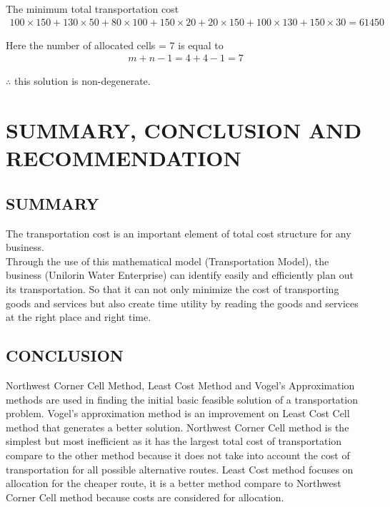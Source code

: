 \documentclass[12pt]{report}
\newcommand{\sps}{\\[0.2cm]}
\newcommand{\NI}{\noindent}
\begin{document}
	\NI The minimum total transportation cost
	\begin{gather*}
		100\times 150 + 130\times 50 + 80\times 100+150\times 20 +20\times 150 + 100\times 130 + 150\times 30 = 61450
	\end{gather*}
	
	\NI Here the number of allocated cells = 7 is equal to
	\begin{gather*}
		m+n-1 = 4+4-1=7
	\end{gather*}
	
	\NI$\therefore$ this solution is non-degenerate.
	
	
	
	
	
	
	
	
	
	
	
	
	
	\chapter{SUMMARY, CONCLUSION AND RECOMMENDATION}
	\section{SUMMARY}
	The transportation cost is an important element of total cost structure for any business.\sps
	Through the use of this mathematical model (Transportation Model), the business (Unilorin Water Enterprise) can identify easily and efficiently plan out its transportation. So that it can not only minimize the cost of transporting goods and services but also create time utility by reading the goods and services at the right place and right time.
	
	\section{CONCLUSION}
	Northwest Corner Cell Method, Least Cost Method and Vogel's Approximation methods are used in finding the initial basic feasible solution of a transportation problem. Vogel's approximation method is an improvement on Least Cost Cell method that generates a better solution. Northwest Corner Cell method is the simplest but most inefficient as it has the largest total cost of transportation compare to the other method because it does not take into account the cost of transportation for all possible alternative routes. Least Cost method focuses on allocation for the cheaper route, it is a better method compare to Northwest Corner Cell method because costs are considered for allocation.
\end{document}
